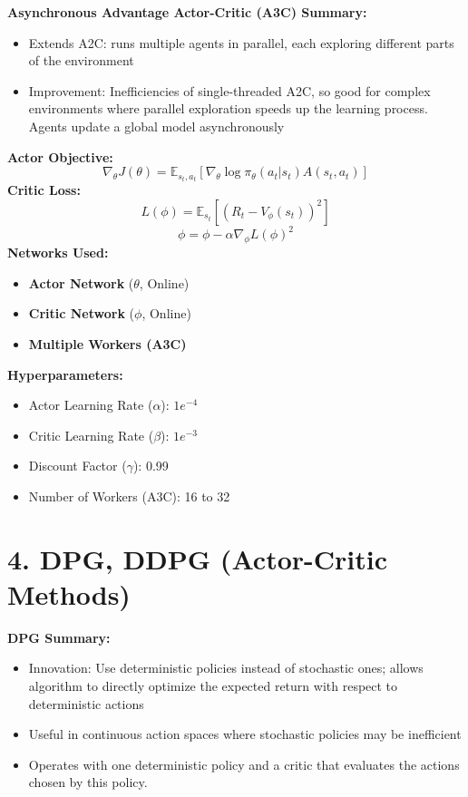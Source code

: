 \documentclass[a4paper,10pt]{article}
\begin{document}
\begin{multicols}{2}
\noindent \textbf{Asynchronous Advantage Actor-Critic (A3C) Summary:}
\begin{itemize}
    \item Extends A2C: runs multiple agents in parallel, each exploring different parts of the environment
    \item Improvement: Inefficiencies of single-threaded A2C, so good for complex environments where parallel exploration speeds up the learning process. Agents update a global model asynchronously
\end{itemize}

\noindent \textbf{Actor Objective:}
\[
\nabla_\theta J(\theta) = \mathbb{E}_{s_t, a_t} \left[ \nabla_\theta \log \pi_\theta(a_t | s_t) A(s_t, a_t) \right]
\]
\noindent \textbf{Critic Loss:}
\[
L(\phi) = \mathbb{E}_{s_t} \left[ \left( R_t - V_\phi(s_t) \right)^2 \right]
\]
\[
\phi = \phi - \alpha \nabla_\phi L(\phi)^2
\]
\textbf{Networks Used:}
\begin{itemize}
    \item \textbf{Actor Network} (\(\theta\), Online)
    \item \textbf{Critic Network} (\(\phi\), Online)
    \item \textbf{Multiple Workers (A3C)}
\end{itemize}
\textbf{Hyperparameters:}
\begin{itemize}
    \item Actor Learning Rate (\(\alpha\)): \(1e^{-4}\)
    \item Critic Learning Rate (\(\beta\)): \(1e^{-3}\)
    \item Discount Factor (\(\gamma\)): 0.99
    \item Number of Workers (A3C): 16 to 32
\end{itemize}

\section*{4. DPG, DDPG (Actor-Critic Methods)}
\textbf{DPG Summary:}
\begin{itemize}
    \item Innovation: Use deterministic policies instead of stochastic ones; allows algorithm to directly optimize the expected return with respect to deterministic actions
    \item Useful in continuous action spaces where stochastic policies may be inefficient
    \item Operates with one deterministic policy and a critic that evaluates the actions chosen by this policy.
\end{itemize}


\end{multicols}
\end{document}
